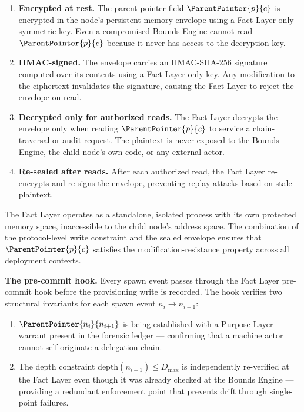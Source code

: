 \begin{enumerate}
    \item \textbf{Encrypted at rest.} The parent pointer field $\ParentPointer{p}{c}$ is encrypted in the node's persistent memory envelope using a Fact Layer-only symmetric key. Even a compromised Bounds Engine cannot read $\ParentPointer{p}{c}$ because it never has access to the decryption key.

    \item \textbf{HMAC-signed.} The envelope carries an HMAC-SHA-256 signature computed over its contents using a Fact Layer-only key. Any modification to the ciphertext invalidates the signature, causing the Fact Layer to reject the envelope on read.

    \item \textbf{Decrypted only for authorized reads.} The Fact Layer decrypts the envelope only when reading $\ParentPointer{p}{c}$ to service a chain-traversal or audit request. The plaintext is never exposed to the Bounds Engine, the child node's own code, or any external actor.

    \item \textbf{Re-sealed after reads.} After each authorized read, the Fact Layer re-encrypts and re-signs the envelope, preventing replay attacks based on stale plaintext.
\end{enumerate}

The Fact Layer operates as a standalone, isolated process with its own protected memory space, inaccessible to the child node's address space. The combination of the protocol-level write constraint and the sealed envelope ensures that $\ParentPointer{p}{c}$ satisfies the modification-resistance property across all deployment contexts.

\medskip
\noindent\textbf{The pre-commit hook.} Every spawn event passes through the Fact Layer pre-commit hook before the provisioning write is recorded. The hook verifies two structural invariants for each spawn event $n_i \to n_{i+1}$:

\begin{enumerate}
    \item[(FC1)] $\ParentPointer{n_i}{n_{i+1}}$ is being established with a Purpose Layer warrant present in the forensic ledger — confirming that a machine actor cannot self-originate a delegation chain.

    \item[(FC2)] The depth constraint $\mathrm{depth}(n_{i+1}) \leq D_{\max}$ is independently re-verified at the Fact Layer even though it was already checked at the Bounds Engine — providing a redundant enforcement point that prevents drift through single-point failures.
\end{enumerate}

